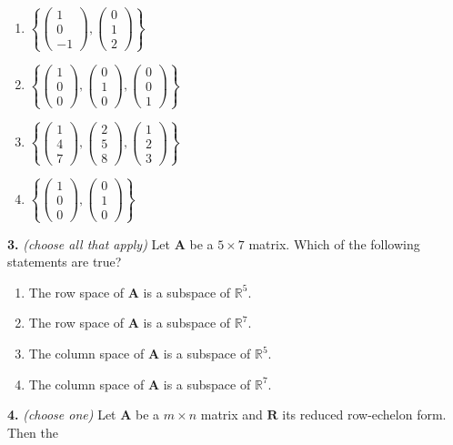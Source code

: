 \documentclass[10pt,a4paper]{article}
\begin{document}
\begin{enumerate}[label=(\Alph*)]
\item \(\left\{\begin{pmatrix}1\\0\\-1\end{pmatrix},\begin{pmatrix}0\\1\\2\end{pmatrix}\right\}\)
\item \(\left\{\begin{pmatrix}1\\0\\0\end{pmatrix},\begin{pmatrix}0\\1\\0\end{pmatrix},\begin{pmatrix}0\\0\\1\end{pmatrix}\right\}\)
\item \(\left\{\begin{pmatrix}1\\4\\7\end{pmatrix},\begin{pmatrix}2\\5\\8\end{pmatrix},\begin{pmatrix}1\\2\\3\end{pmatrix}\right\}\)
\item \(\left\{\begin{pmatrix}1\\0\\0\end{pmatrix},\begin{pmatrix}0\\1\\0\end{pmatrix}\right\}\)
\end{enumerate}
\smallskip
\textbf{3.} \textit{(choose all that apply)} Let \(\mathbf{A}\) be a \(5\times 7\) matrix. Which of the following statements are true?

\begin{enumerate}[label=(\Alph*)]
\item The row space of \(\mathbf{A}\) is a subspace of \(\mathbb{R}^5\).
\item The row space of \(\mathbf{A}\) is a subspace of \(\mathbb{R}^7\).
\item The column space of \(\mathbf{A}\) is a subspace of \(\mathbb{R}^5\).
\item The column space of \(\mathbf{A}\) is a subspace of \(\mathbb{R}^7\).
\end{enumerate}
\smallskip
\textbf{4.} \textit{(choose one)} Let \(\mathbf{A}\) be a \(m\times n\) matrix and \(\mathbf{R}\) its reduced row-echelon form. Then the
\end{document}
